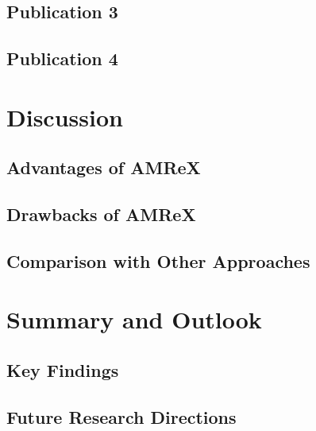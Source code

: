 \documentclass[12pt, a4paper]{article}
\begin{document}
\subsection{Publication 3}
\subsection{Publication 4}

\section{Discussion}
\subsection{Advantages of AMReX}
\subsection{Drawbacks of AMReX}
\subsection{Comparison with Other Approaches}

\section{Summary and Outlook}
\subsection{Key Findings}
\subsection{Future Research Directions}
\end{document}
